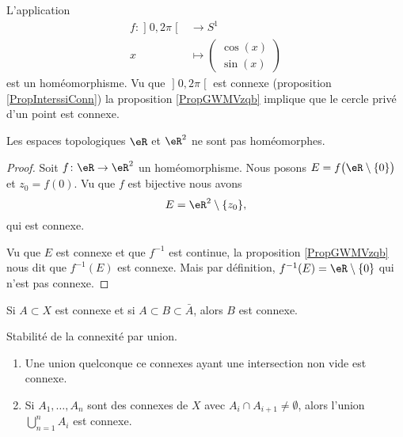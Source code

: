 \begin{example}
    L'application
    \begin{equation}
        \begin{aligned}
            f\colon \mathopen] 0 , 2\pi \mathclose[&\to S^1 \\
                x&\mapsto \begin{pmatrix}
                    \cos(x)    \\ 
                    \sin(x)    
                \end{pmatrix}
        \end{aligned}
    \end{equation}
    est un homéomorphisme. Vu que \( \mathopen] 0 , 2\pi \mathclose[\) est connexe (proposition \ref{PropInterssiConn}) la proposition \ref{PropGWMVzqb} implique que le cercle privé d'un point est connexe.
\end{example}

\begin{example}
    Les espaces topologiques \( \eR\) et \( \eR^2\) ne sont pas homéomorphes.
\end{example}

\begin{proof}
    Soit \( f\colon \eR\to \eR^2\) un homéomorphisme. Nous posons \( E=f\big( \eR\setminus\{ 0 \} \big)\) et \( z_0=f(0)\). Vu que \( f\) est bijective nous avons
    \begin{equation}
        E=\eR^2\setminus\{ z_0 \},
    \end{equation}
    qui est connexe.

    Vu que \( E\) est connexe et que \( f^{-1}\) est continue, la proposition \ref{PropGWMVzqb} nous dit que \( f^{-1}(E)\) est connexe. Mais par définition, \( f^{-1}(E)=\eR\setminus\{ 0 \}\) qui n'est pas connexe.
\end{proof}


\begin{proposition}
    Si \( A\subset X\) est connexe et si \( A\subset B\subset \bar A\), alors \( B\) est connexe.
\end{proposition}

\begin{proposition} \label{PropIWIDzzH}
    Stabilité de la connexité par union.
    \begin{enumerate}
        \item
    Une union quelconque ce connexes ayant une intersection non vide est connexe.
\item
    Si \( A_1,\ldots, A_n\) sont des connexes de \( X\) avec \( A_i\cap A_{i+1}\neq \emptyset\), alors l'union \( \bigcup_{n=1}^nA_i\) est connexe.
    \end{enumerate}
\end{proposition}

